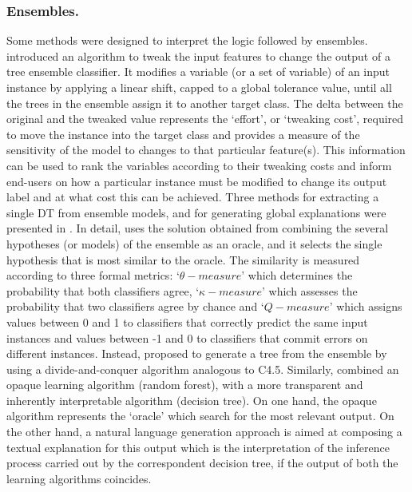 \documentclass[final,1p,times]{elsarticle}
\begin{document}
\subsubsection{Ensembles.} Some methods were designed to interpret the logic followed by ensembles. \cite{tolomei2017interpretable} introduced an algorithm to tweak the input features to change the output of a tree ensemble classifier. It modifies a variable (or a set of variable) of an input instance by applying a linear shift, capped to a global tolerance value, until all the trees in the ensemble assign it to another target class. The delta between the original and the tweaked value represents the `effort', or `tweaking cost', required to move the instance into the target class and provides a measure of the sensitivity of the model to changes to that particular feature(s). This information can be used to rank the variables according to their tweaking costs and inform end-users on how a particular instance must be modified to change its output label and at what cost this can be achieved.
Three methods for extracting a single DT from ensemble models, and for generating global explanations were presented in \cite{alonso2018explainable, ferri2002ensemble, van2007seeing}. 
In detail, \cite{ferri2002ensemble} uses the solution obtained from combining the several hypotheses (or models) of the ensemble as an oracle, and it selects the single hypothesis that is most similar to the oracle. The similarity is measured according to three formal metrics: `$\theta - measure$' which determines the probability that both classifiers agree, `$\kappa - measure$' which assesses the probability that two classifiers agree by chance and `$Q-measure$' which assigns values between 0 and 1 to classifiers that correctly predict the same input instances and values between -1 and 0 to classifiers that commit errors on different instances.
Instead, \cite{van2007seeing} proposed to generate a tree from the ensemble by using a divide-and-conquer algorithm analogous to C4.5. 
Similarly, \cite{alonso2018explainable} combined an opaque learning algorithm (random forest), with a more transparent and inherently interpretable algorithm (decision tree).
On one hand, the opaque algorithm represents the `oracle' which search for the most relevant output. On the other hand, a natural language generation approach is aimed at composing a textual explanation for this output which is the interpretation of the inference process carried out by the correspondent decision tree, if the output of both the learning algorithms coincides.
\end{document}
